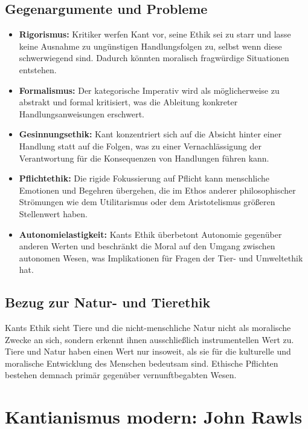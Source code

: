 \documentclass{article}
\begin{document}
\subsection{Gegenargumente und Probleme}
\begin{itemize}
	\item \textbf{Rigorismus:} Kritiker werfen Kant vor, seine Ethik sei zu starr und lasse keine Ausnahme zu ungünstigen Handlungsfolgen zu, selbst wenn diese schwerwiegend sind. Dadurch könnten moralisch fragwürdige Situationen entstehen.

	\item \textbf{Formalismus:} Der kategorische Imperativ wird als möglicherweise zu abstrakt und formal kritisiert, was die Ableitung konkreter Handlungsanweisungen erschwert.

	\item \textbf{Gesinnungsethik:} Kant konzentriert sich auf die Absicht hinter einer Handlung statt auf die Folgen, was zu einer Vernachlässigung der Verantwortung für die Konsequenzen von Handlungen führen kann.

	\item \textbf{Pflichtethik:} Die rigide Fokussierung auf Pflicht kann menschliche Emotionen und Begehren übergehen, die im Ethos anderer philosophischer Strömungen wie dem Utilitarismus oder dem Aristotelismus größeren Stellenwert haben.

	\item \textbf{Autonomielastigkeit:} Kants Ethik überbetont Autonomie gegenüber anderen Werten und beschränkt die Moral auf den Umgang zwischen autonomen Wesen, was Implikationen für Fragen der Tier- und Umweltethik hat.
\end{itemize}

\subsection{Bezug zur Natur- und Tierethik}
Kants Ethik sieht Tiere und die nicht-menschliche Natur nicht als moralische Zwecke an sich, sondern erkennt ihnen ausschließlich instrumentellen Wert zu. Tiere und Natur haben einen Wert nur insoweit, als sie für die kulturelle und moralische Entwicklung des Menschen bedeutsam sind. Ethische Pflichten bestehen demnach primär gegenüber vernunftbegabten Wesen.


\newpage
\section{Kantianismus modern: John Rawls}
\end{document}
